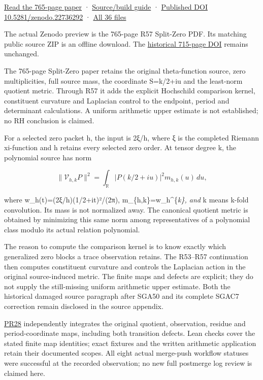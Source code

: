 \documentclass[
]{article}
\begin{document}
\href{https://zenodo.org/api/records/22736292/files/35-splitzero-sga-connes-continuation-765p.pdf/content}{Read
the 765-page paper} ·
\href{workbenches/splitzero-tandem/continuations/20260913-sga-connes/README.md}{Source/build
guide} · \href{https://doi.org/10.5281/zenodo.22736292}{Published DOI
10.5281/zenodo.22736292} ·
\href{calculation_edition_20260913_sga_connes/README.md}{All 36 files}

The actual Zenodo preview is the 765-page R57 Split-Zero PDF. Its
matching public source ZIP is an offline download. The
\href{https://doi.org/10.5281/zenodo.22732414}{historical 715-page DOI}
remains unchanged.

The 765-page Split-Zero paper retains the original theta-function
source, zero multiplicities, full source mass, the coordinate S=k/2+iu
and the least-norm quotient metric. Through R57 it adds the explicit
Hochschild comparison kernel, constituent curvature and Laplacian
control to the endpoint, period and determinant calculations. A uniform
arithmetic upper estimate is not established; no RH conclusion is
claimed.

For a selected zero packet h, the input is 2ξ/h, where ξ is the
completed Riemann xi-function and h retains every selected zero order.
At tensor degree k, the polynomial source has norm

\[\|\mathcal V_{h,k}P\|^2=\int_{\mathbb R}|P(k/2+iu)|^2m_{h,k}(u)\,du,\]

where w\_h(t)=\textbar(2ξ/h)(1/2+it)\textbar²/(2π),
m\_\{h,k\}=w\_h\^{}\{\emph{k\}, and }k means k-fold convolution. Its
mass is not normalized away. The canonical quotient metric is obtained
by minimizing this same norm among representatives of a polynomial class
modulo its actual relation polynomial.

The reason to compute the comparison kernel is to know exactly which
generalized zero blocks a trace observation retains. The R53--R57
continuation then computes constituent curvature and controls the
Laplacian action in the original source-induced metric. The finite maps
and defects are explicit; they do not supply the still-missing uniform
arithmetic upper estimate. Both the historical damaged source paragraph
after SGA50 and its complete SGAC7 correction remain disclosed in the
source appendix.

\href{workbenches/tau-split-integration/RESEARCH_NOTE.md}{PR28}
independently integrates the original quotient, observation, residue and
period-coordinate maps, including both transition defects. Lean checks
cover the stated finite map identities; exact fixtures and the written
arithmetic application retain their documented scopes. All eight actual
merge-push workflow statuses were successful at the recorded
observation; no new full postmerge log review is claimed here.
\end{document}
